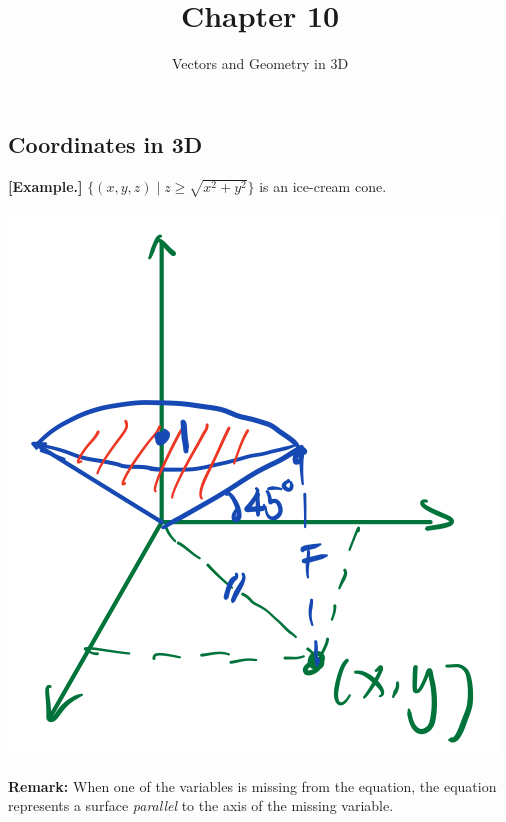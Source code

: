 \documentclass[11pt, a4paper]{MATH2023}
\title{Chapter 10}
\subtitle{Vectors and Geometry in 3D}
\newcommand{\eg}{\textbf{[Example.] }}
\begin{document}
\begin{spacing}{1.3}
    \section{Coordinates in 3D}

    \eg $\{ (x,y,z)\mid z\ge \sqrt{x^2+y^2}\}$ is an ice-cream cone.

    \begin{center}
        \includegraphics[scale=0.25]{images/Ch10-cone.jpeg}
    \end{center}
    {\bf Remark: }When one of the variables is missing from the equation, 
    the equation represents a surface {\it parallel} to the axis of the 
    missing variable.


\end{spacing}
\end{document}
